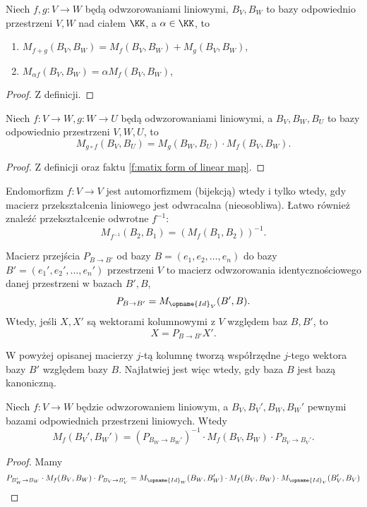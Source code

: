 \begin{theorem}
    Niech $f, g : V \to W$ będą odwzorowaniami liniowymi, $B_V, B_W$ to bazy odpowiednio przestrzeni $V, W$ nad ciałem $\KK$, a $\alpha \in \KK$, to
    \begin{enumerate}
        \item $M_{f+g}(B_V, B_W) = M_f(B_V, B_W) + M_g(B_V, B_W)$,
        \item $M_{\alpha f}(B_V, B_W) = \alpha M_f(B_V, B_W)$,
    \end{enumerate}
\end{theorem}
\begin{proof}
    Z definicji.
\end{proof}

\begin{theorem}
    Niech $f : V \to W, g : W \to U$ będą odwzorowaniami liniowymi, a $B_V, B_W, B_U$ to bazy odpowiednio przestrzeni $V, W, U$, to
    \[ M_{g\circ f}(B_V, B_U) = M_g(B_W, B_U) \cdot M_f(B_V, B_W). \]
\end{theorem}
\begin{proof}
    Z definicji oraz faktu \ref{f:matix form of linear map}.
\end{proof}

\begin{corollary}
    Endomorfizm $f : V \to V$ jest automorfizmem (bijekcją) wtedy i tylko wtedy, gdy macierz przekształcenia liniowego jest odwracalna (nieosobliwa). Łatwo również znaleźć przekształcenie odwrotne $f^{-1}$:
    \[ M_{f^{-1}}(B_2, B_1) = (M_f(B_1, B_2))^{-1}. \]
\end{corollary}

\begin{definition}
    Macierz przejścia $P_{B \to B'}$ od bazy $B = (e_1, e_2, \ldots, e_n)$ do bazy $B' = (e_1', e_2', \ldots, e_n')$ przestrzeni $V$ to macierz odwzorowania identycznościowego danej przestrzeni w bazach $B', B$,
    \[ P_{B\to B'} = M_{\opname{Id}_V}(B', B). \]
    Wtedy, jeśli $X, X'$ są wektorami kolumnowymi z $V$ względem baz $B, B'$, to
    \[ X = P_{B \to B'}X'. \]
\end{definition}

\begin{remark*}
    W powyżej opisanej macierzy $j$-tą kolumnę tworzą współrzędne $j$-tego wektora bazy $B'$ względem bazy $B$. Najłatwiej jest więc wtedy, gdy baza $B$ jest bazą kanoniczną.
\end{remark*}

\begin{theorem}
    \label{t:changing transformation matrix when changing bases}
    Niech $f: V \to W$ będzie odwzorowaniem liniowym, a $B_V, B_V', B_W, B_W'$ pewnymi bazami odpowiednich przestrzeni liniowych. Wtedy
    \[ M_f(B_V', B_W') = (P_{B_W \to B_W'})^{-1} \cdot M_f(B_V, B_W) \cdot P_{B_V \to B_V'}. \]
\end{theorem}
\begin{proof}
    Mamy
    \[ P_{B_W' \to B_W} \cdot M_f(B_V, B_W) \cdot P_{B_V \to B_V'} = M_{\opname{Id}_W}(B_W, B_W') \cdot M_f(B_V, B_W) \cdot M_{\opname{Id}_V}(B_V', B_V) \]
\end{proof}

